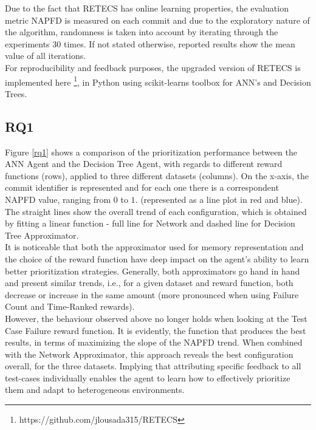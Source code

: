 Due to the fact that RETECS has online learning properties, the evaluation metric NAPFD is measured on each commit and due to the exploratory nature of the algorithm, randomness is taken into account by iterating through the experiments 30 times. If not stated otherwise, reported results show the mean value of all iterations.
\\

For reproducibility and feedback  purposes, the upgraded version of RETECS is implemented here \footnote{https://github.com/jlousada315/RETECS}, in Python using scikit-learns toolbox for ANN's and Decision Trees. 

\subsection{RQ1}

Figure \ref{rq1} shows a comparison of the prioritization performance between the ANN Agent and the Decision Tree Agent, with regards to different reward functions (rows), applied to three different datasets (columns). On the x-axis, the commit identifier is represented and for each one there is a correspondent NAPFD value, ranging from $0$ to $1$. (represented as a line plot in red and blue). The straight lines show the overall trend of each configuration, which is obtained by fitting a linear function - full line for Network and dashed line for Decision Tree Approximator. 
\\

It is noticeable that both the approximator used for memory representation and the choice of the reward function have deep impact on the agent's ability to learn better prioritization strategies. Generally, both approximators go hand in hand and present similar trends, i.e., for a given dataset and reward function, both decrease or increase in the same amount (more pronounced when using Failure Count and Time-Ranked rewards). 
\\

However, the behaviour observed above no longer holds when looking at the Test Case Failure reward function. It is evidently, the function that produces the best results, in terms of maximizing the slope of the NAPFD trend. When combined with the Network Approximator, this approach reveals the best configuration overall, for the three datasets. Implying that attributing specific feedback to all test-cases individually enables the agent to learn how to effectively prioritize them and adapt to heterogeneous environments. 
\\

